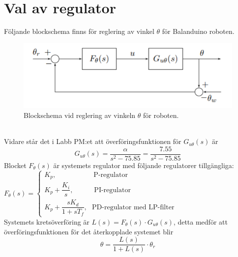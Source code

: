 \documentclass[11pt]{article}
\begin{document}

\renewcommand{\contentsname}{Innehållsförteckning}
\tableofcontents
\pagestyle{empty}
\newpage
\setcounter{page}{1}
\pagestyle{fancy}
\section{Val av regulator}
Följande blockschema finns för reglering av vinkel $\theta$ för Balanduino roboten.
\begin{figure}[h!]
\centering
\includegraphics[scale=1]{Figures/blockschema.png}
\caption{ Blockschema vid reglering av vinkeln $\theta$ för roboten.}
\end{figure}\\
Vidare står det i Labb PM:et att överföringsfunktionen för $G_{u \theta}(s)$ är
$$G_{u\theta}(s)=\dfrac{\alpha}{s^2-75.85}=\dfrac{7.55}{s^2-75.85}$$
Blocket $F_\theta(s)$ är systemets regulator med följande regulatorer tillgängliga:\\[0.5em]

$
F_\theta(s)=
\begin{cases}
K_p, \quad \quad \quad \quad \quad \ \ \text{P-regulator}\\[0.5em]
K_p+\dfrac{K_i}{s}, \quad \quad \quad \text{PI-regulator}\\[0.5em]
K_p+\dfrac{sK_d}{1+sT_f},  \ \ \ \text{PD-regulator med LP-filter}
\end{cases}
$ \\[1em]
Systemets kretsöverföring är $L(s)=F_\theta(s)\cdot G_{u \theta}(s)$, detta medför att överföringsfunktionen för det återkopplade systemet blir\\[0.5em]
\begin{equation}
\theta = \dfrac{L(s)}{1+L(s)}\cdot \theta_r
\end{equation}
\end{document}
